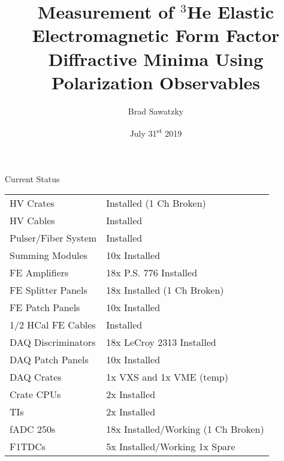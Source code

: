 \documentclass[10pt]{beamer}
\title{Measurement of $^3$He Elastic Electromagnetic Form Factor Diffractive Minima Using Polarization Observables}
\subtitle{}
\date{July 31\textsuperscript{st} 2019}
\author{Brad Sawatzky}
\institute{Jefferson Lab}
\begin{document}
\maketitle

\begin{frame}{Current Status}

	\begin{table}[t]
	\centering
	\begin{tabular}{|ll|}
	\hline
	\makecell{Item} & \makecell{Status}\\
	\hline
	HV Crates & Installed (1 Ch Broken) \\
	HV Cables & Installed \\
	Pulser/Fiber System & Installed \\
	Summing Modules & 10x Installed \\
	FE Amplifiers & 18x P.S. 776 Installed \\
	FE Splitter Panels & 18x Installed (1 Ch Broken)\\
	FE Patch Panels & 10x Installed \\
	1/2 HCal FE Cables & Installed \\
	DAQ Discriminators & 18x LeCroy 2313 Installed \\
	DAQ Patch Panels & 10x Installed \\
	DAQ Crates & 1x VXS and 1x VME (temp) \\
	Crate CPUs & 2x Installed \\
	TIs & 2x Installed \\
	fADC 250s & 18x Installed/Working (1 Ch Broken) \\
	F1TDCs & 5x Installed/Working 1x Spare \\
	\hline
	\end{tabular}
	\label{tab:status}
	\end{table}
	
\end{frame}
\end{document}
